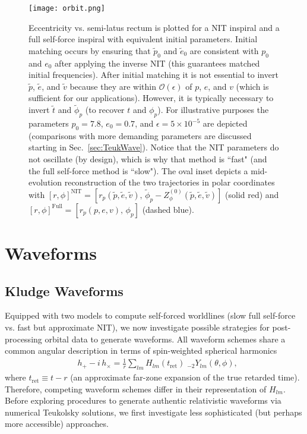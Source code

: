 \documentclass[aps,prd,twocolumn,showpacs,notitlepage,eqsecnum,
superscriptaddress,nofootinbib]{revtex4-1}
\begin{document}
\begin{figure}
\texttt{[image: orbit.png]}
\caption{\label{fig:orbit} Eccentricity vs. semi-latus rectum is plotted for a NIT inspiral and a full self-force inspiral with equivalent initial parameters. Initial matching occurs by ensuring that $\tilde{p}_0$ and $\tilde{e}_0$ are consistent with $p_0$ and $e_0$ after applying the inverse NIT (this guarantees matched initial frequencies). After initial matching it is not essential to invert $\tilde{p}$, $\tilde{e}$, and $\tilde{v}$ because they are within $\mathcal{O}(\epsilon)$ of $p$, $e$, and $v$ (which is sufficient for our applications). However, it is typically necessary to invert $\tilde{t}$ and $\tilde{\phi}_p$ (to recover $t$ and $\phi_p$). For illustrative purposes the parameters $p_0=7.8$, $e_0=0.7$, and $\epsilon=5\times 10^{-5}$ are depicted (comparisons with more demanding parameters are discussed starting in Sec.~\ref{sec:TeukWave}). Notice that the NIT parameters do not oscillate (by design), which is why that method is ``fast" (and the full self-force method is ``slow"). The oval inset depicts a mid-evolution reconstruction of the two trajectories in polar coordinates with $[r,\phi]^\text{NIT} = [r_p(\tilde{p},\tilde{e},\tilde{v}),\,\tilde{\phi}_p-Z^{(0)}_\phi(\tilde{p},\tilde{e},\tilde{v})]$ (solid red) and $[r,\phi]^\text{Full} = [r_p(p,e,v),\,\phi_p]$ (dashed blue). }
\end{figure}

\section{Waveforms}
\label{sec:waveforms}

\subsection{Kludge Waveforms}
\label{sec:KludgeWave}

Equipped with two models to compute self-forced worldlines (slow full self-force vs. fast but approximate NIT), we now investigate possible strategies for post-processing orbital data to generate waveforms. All waveform schemes share a common angular description in terms of spin-weighted spherical harmonics
\begin{align}
\label{eq:hwave}
&h_+ - i\, h_\times = \frac{1}{r}\sum_{lm} H_{lm}(t_\text{ret})\;_{-2}Y_{lm}(\theta, \phi) ,
\end{align}
where $t_\text{ret}\equiv t-r$ (an approximate far-zone expansion of the true retarded time). Therefore, competing waveform schemes differ in their representation of $H_{lm}$. Before exploring procedures to generate authentic relativistic waveforms via numerical Teukolsky solutions, we first investigate less sophisticated (but perhaps more accessible) approaches. 
\end{document}
